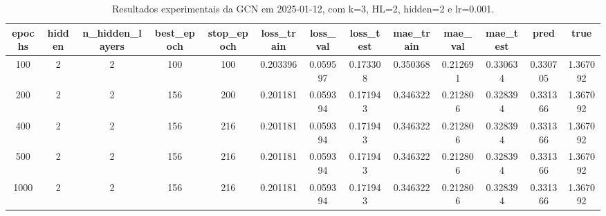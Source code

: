 \begin{table}[h]
\centering
\caption{Resultados experimentais da GCN em 2025-01-12, com k=3, HL=2, hidden=2 e lr=0.001.}
\label{tab:gcn_results_k3_hl2_h2_d20250112}
\begin{tabular}{ccccccccccccc}
\toprule
epochs & hidden & n\_hidden\_layers & best\_epoch & stop\_epoch & loss\_train & loss\_val & loss\_test & mae\_train & mae\_val & mae\_test & pred & true \\
\midrule
100 & 2 & 2 & 100 & 100 & 0.203396 & 0.059597 & 0.173308 & 0.350368 & 0.212691 & 0.330634 & 0.330705 & 1.367092 \\
200 & 2 & 2 & 156 & 200 & 0.201181 & 0.059394 & 0.171943 & 0.346322 & 0.212806 & 0.328394 & 0.331366 & 1.367092 \\
400 & 2 & 2 & 156 & 216 & 0.201181 & 0.059394 & 0.171943 & 0.346322 & 0.212806 & 0.328394 & 0.331366 & 1.367092 \\
500 & 2 & 2 & 156 & 216 & 0.201181 & 0.059394 & 0.171943 & 0.346322 & 0.212806 & 0.328394 & 0.331366 & 1.367092 \\
1000 & 2 & 2 & 156 & 216 & 0.201181 & 0.059394 & 0.171943 & 0.346322 & 0.212806 & 0.328394 & 0.331366 & 1.367092 \\
\bottomrule
\end{tabular}
\end{table}
